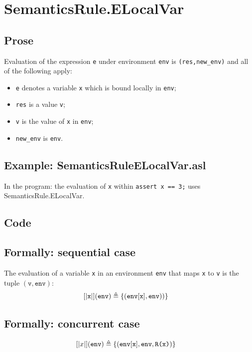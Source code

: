 \documentclass{book}
\begin{document}


\section{SemanticsRule.ELocalVar \label{sec:SemanticsRule.ELocalVar}}

  \subsection{Prose}
  Evaluation of the expression \texttt{e} under environment \texttt{env} is
  \texttt{(res,new\_env)} and all of the following apply:
  \begin{itemize}
  \item \texttt{e} denotes a variable \texttt{x} which is bound locally in \texttt{env};
  \item \texttt{res} is a value \texttt{v};
  \item \texttt{v} is the value of \texttt{x} in \texttt{env};
  \item \texttt{new\_env} is \texttt{env}.
  \end{itemize}

  \subsection{Example: SemanticsRuleELocalVar.asl}
    In the program:
    the evaluation of \texttt{x} within \texttt{assert x == 3;} uses SemanticsRule.ELocalVar.

  \subsection{Code}

\begin{formal}
  \subsection{Formally: sequential case}
  The evaluation of a variable \texttt{x} in an environment \texttt{env} that maps \texttt{x} to \texttt{v}
  is the tuple $(\texttt{v},\texttt{env})$: 
  \begin{align}
  \left[| \texttt{x} \right|](\texttt{env}) & \triangleq \left\{ (\texttt{env}[\texttt{x}], \texttt{env})) \right\}
  \label{eq:sem-seq-var}
  \end{align} 
 
  \subsection{Formally: concurrent case}
  \begin{align}
  \left[| x \right|](\texttt{env}) & \triangleq \left\{ (\texttt{env}[\texttt{x}], \texttt{env}, \texttt{R(x)}) \right\}
  \label{eq:sem-conc-var}
  \end{align} 
\end{formal}
\end{document}
